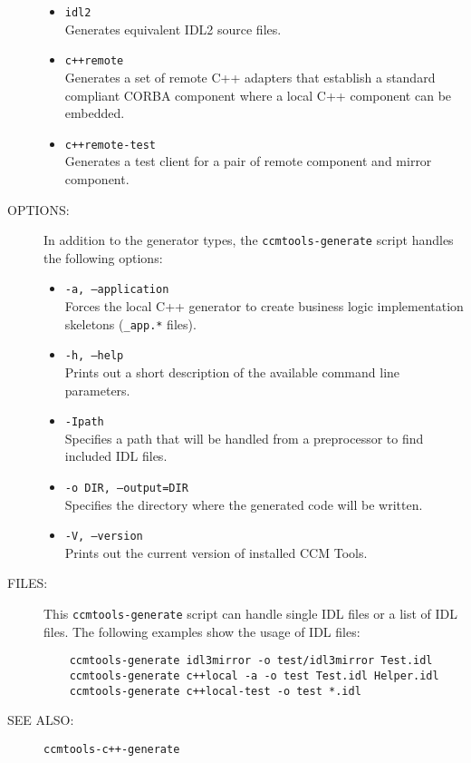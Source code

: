 \begin{description}
\begin{itemize}
  \item {\tt idl2} \\
    Generates equivalent IDL2 source files.

  \item {\tt c++remote} \\ 
    Generates a set of remote C++ adapters that establish a standard
    compliant CORBA component where a local C++ component can be embedded.

  \item {\tt c++remote-test}\\
    Generates a test client for a pair of remote component and mirror component.
  \end{itemize}
  
\item [OPTIONS:]
  In addition to the generator types, the {\tt ccmtools-generate} script handles
  the following options:
  \begin{itemize}
  \item {\tt -a, --application} \\
    Forces the local C++ generator to create business logic
    implementation skeletons ({\tt *\_app.*} files).

  \item {\tt -h, --help} \\
    Prints out a short description of the available command line parameters.

  \item {\tt -Ipath} \\
    Specifies a path that will be handled from a preprocessor to find 
    included IDL files.

  \item {\tt -o DIR, --output=DIR} \\
    Specifies the directory where the generated code will be written. 

  \item {\tt -V, --version} \\
    Prints out the current version of installed CCM Tools.
  \end{itemize}
  
\item [FILES:]
  This {\tt ccmtools-generate} script can handle single IDL files or a list of IDL
  files. The following examples show the usage of IDL files: 
  \begin{verbatim}
    ccmtools-generate idl3mirror -o test/idl3mirror Test.idl
    ccmtools-generate c++local -a -o test Test.idl Helper.idl 
    ccmtools-generate c++local-test -o test *.idl
  \end{verbatim}

\item [SEE ALSO:]
  {\tt ccmtools-c++-generate}
  
\end{description}


